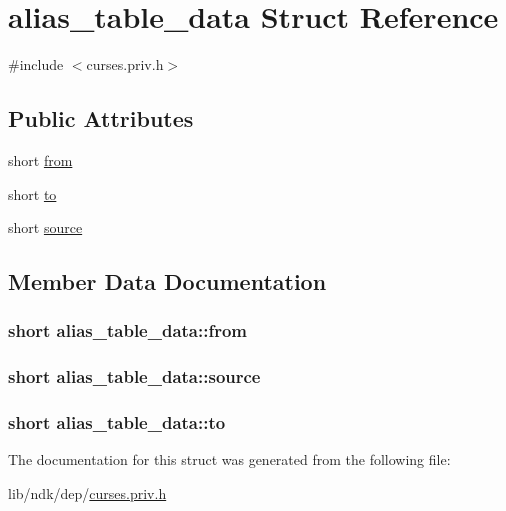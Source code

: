 \hypertarget{structalias__table__data}{\section{alias\-\_\-table\-\_\-data Struct Reference}
\label{structalias__table__data}
}


{\ttfamily \#include $<$curses.\-priv.\-h$>$}

\subsection*{Public Attributes}
\begin{DoxyCompactItemize}
\item 
short \hyperlink{structalias__table__data_ad7e57ddd252269d8b90de5e45e0ad0f8}{from}
\item 
short \hyperlink{structalias__table__data_a99a729691b9346d598f4620988c56267}{to}
\item 
short \hyperlink{structalias__table__data_a481efd522f348a134a6d3d31da96715c}{source}
\end{DoxyCompactItemize}


\subsection{Member Data Documentation}
\hypertarget{structalias__table__data_ad7e57ddd252269d8b90de5e45e0ad0f8}{
\subsubsection[{from}]{\setlength{\rightskip}{0pt plus 5cm}short alias\-\_\-table\-\_\-data\-::from}}\label{structalias__table__data_ad7e57ddd252269d8b90de5e45e0ad0f8}
\hypertarget{structalias__table__data_a481efd522f348a134a6d3d31da96715c}{
\subsubsection[{source}]{\setlength{\rightskip}{0pt plus 5cm}short alias\-\_\-table\-\_\-data\-::source}}\label{structalias__table__data_a481efd522f348a134a6d3d31da96715c}
\hypertarget{structalias__table__data_a99a729691b9346d598f4620988c56267}{
\subsubsection[{to}]{\setlength{\rightskip}{0pt plus 5cm}short alias\-\_\-table\-\_\-data\-::to}}\label{structalias__table__data_a99a729691b9346d598f4620988c56267}


The documentation for this struct was generated from the following file\-:\begin{DoxyCompactItemize}
\item 
lib/ndk/dep/\hyperlink{curses_8priv_8h}{curses.\-priv.\-h}\end{DoxyCompactItemize}
